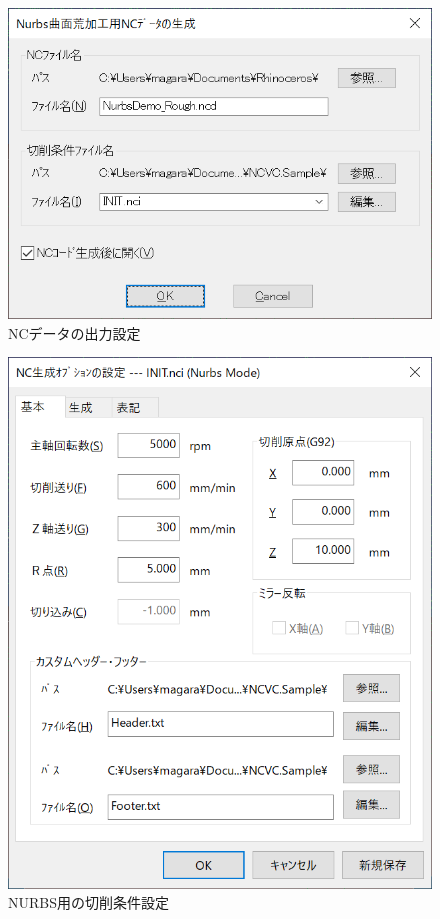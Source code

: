 \begin{minipage}{0.5\textwidth}
\begin{figure}[H]
\centering
\includegraphics[scale=0.7]{No2/fig/fig26.png}
\caption{NCデータの出力設定}
\label{fig:ncvc26}
\end{figure}
\end{minipage}
\begin{minipage}{0.5\textwidth}
\begin{figure}[H]
\centering
\includegraphics[scale=0.7]{No2/fig/fig27.png}
\caption{NURBS用の切削条件設定}
\label{fig:ncvc27}
\end{figure}
\end{minipage}


